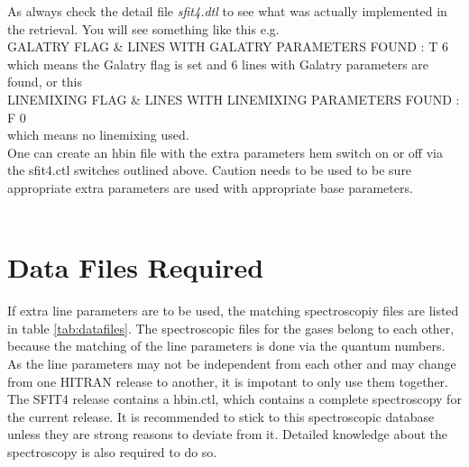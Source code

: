 \documentclass[12pt, letterpaper]{article}
\begin{document}
\noindent As always check the detail file \textit{sfit4.dtl} to see what was actually implemented in the retrieval.  You will see something like this e.g.\\

\noindent GALATRY FLAG \& LINES WITH GALATRY PARAMETERS FOUND       :  T      6 \\

\noindent which means the Galatry flag is set and 6 lines with Galatry parameters are found, or this \\

\noindent LINEMIXING FLAG \& LINES WITH LINEMIXING PARAMETERS FOUND :  F      0 \\

\noindent which means no linemixing used.\\

\noindent One can create an hbin file with the extra parameters hem switch on or off via the sfit4.ctl switches outlined above.  Caution needs to be used to be sure appropriate extra parameters are used with appropriate base parameters.  \\ \\



\section{Data Files Required} 
\label{sec:datafiles}


If extra line parameters are to be used, the matching spectroscopiy
files are listed in table \ref{tab:datafiles}. The spectroscopic files
for the gases belong to each other, because the matching of the line
parameters is done via the quantum numbers. As the line parameters may
not be independent from each other and may change from one HITRAN
release to another, it is impotant to only use them together. The
SFIT4 release contains a hbin.ctl, which contains a complete
spectroscopy for the current release. It is recommended to stick to
this spectroscopic database unless they are strong reasons to deviate
from it. Detailed knowledge about the spectroscopy is also required to do so.
\end{document}
